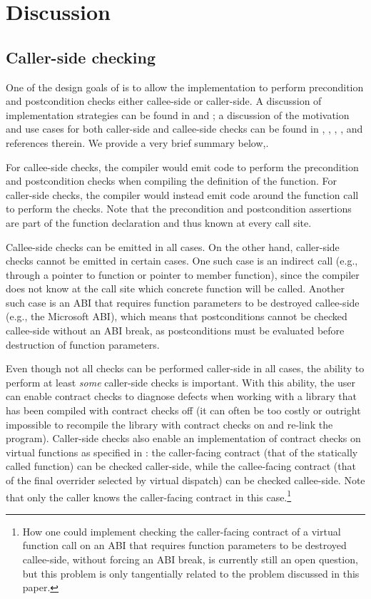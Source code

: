 \section{Discussion}

\subsection{Caller-side checking}

One of the design goals of \cite{P2900R10} is to allow the implementation to perform precondition and postcondition checks either callee-side or caller-side. A discussion of implementation strategies can be found in \cite{P3267R0} and \cite{P3321R0}; a discussion of the motivation and use cases for both caller-side and callee-side checks can be found in \cite{P3228R1}, \cite{P3264R1}, \cite{P3270R0}, \cite{P3321R0}, and references therein. We provide a very brief summary below,.

For callee-side checks, the compiler would emit code to perform the precondition and postcondition checks when compiling the definition of the function. For caller-side checks, the compiler would instead emit code around the function call to perform the checks. Note that the precondition and postcondition assertions are part of the function declaration and thus known at every call site.

Callee-side checks can be emitted in all cases. On the other hand, caller-side checks cannot be emitted in certain cases. One such case is an indirect call (e.g., through a pointer to function or pointer to member function), since the compiler does not know at the call site which concrete function will be called. Another such case is an ABI that requires function parameters to be destroyed callee-side (e.g., the Microsoft ABI), which means that postconditions cannot be checked callee-side without an ABI break, as postconditions must be evaluated before destruction of function parameters.

Even though not all checks can be performed caller-side in all cases, the ability to perform at least \emph{some} caller-side checks is important. With this ability, the user can enable contract checks to diagnose defects when working with a library that has been compiled with contract checks off (it can often be too costly or outright impossible to recompile the library with contract checks on and re-link the program). Caller-side checks also enable an implementation of contract checks on virtual functions as specified in \cite{P2900R10}: the caller-facing contract (that of the statically called function) can be checked caller-side, while the callee-facing contract (that of the final overrider selected by virtual dispatch) can be checked callee-side. Note that only the caller knows the caller-facing contract in this case.\footnote{How one could implement checking the caller-facing contract of a virtual function call on an ABI that requires function parameters to be destroyed callee-side, without forcing an ABI break, is currently still an open question, but this problem is only tangentially related to the problem discussed in this paper.}

